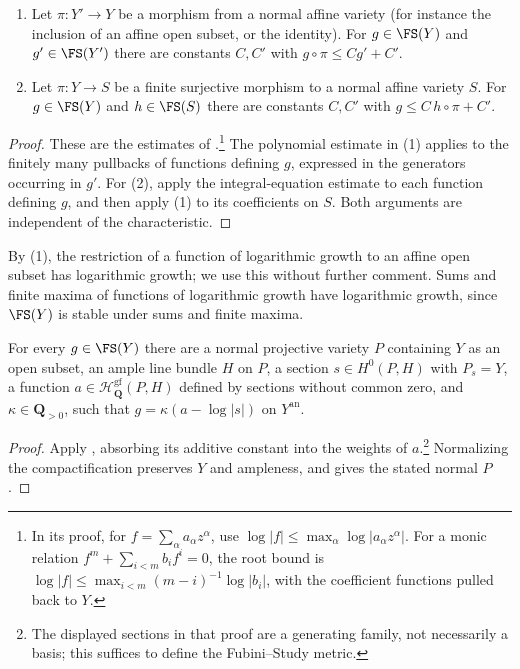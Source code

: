 \documentclass[11pt,a4paper]{article}
\newcommand{\an}{\mathrm{an}}          %
\begin{document}
\begin{lemma}\label{lem:growth}
\begin{enumerate}
\item Let $\pi\colon Y'\to Y$ be a morphism from a normal affine variety \textup(for instance the inclusion of an affine open subset, or the identity\textup). For $g\in\FS(Y)$ and $g'\in\FS(Y')$ there are constants $C,C'$ with $g\circ\pi\le Cg'+C'$.
\item Let $\pi\colon Y\to S$ be a finite surjective morphism to a normal affine variety $S$. For $g\in\FS(Y)$ and $h\in\FS(S)$ there are constants $C,C'$ with $g\le C\,h\circ\pi+C'$.
\end{enumerate}
\end{lemma}

\begin{proof}
These are the estimates of \cite[Lemma~3.16]{Wu26}.\footnote{In its proof, for $f=\sum_\alpha a_\alpha z^\alpha$, use $\log|f|\le\max_\alpha\log|a_\alpha z^\alpha|$. For a monic relation $f^m+\sum_{i<m}b_if^i=0$, the root bound is $\log|f|\le\max_{i<m}(m-i)^{-1}\log|b_i|$, with the coefficient functions pulled back to $Y$.} The polynomial estimate in (1) applies to the finitely many pullbacks of functions defining $g$, expressed in the generators occurring in $g'$. For (2), apply the integral-equation estimate to each function defining $g$, and then apply (1) to its coefficients on $S$. Both arguments are independent of the characteristic.
\end{proof}

By (1), the restriction of a function of logarithmic growth to an affine open subset has logarithmic growth; we use this without further comment. Sums and finite maxima of functions of logarithmic growth have logarithmic growth, since $\FS(Y)$ is stable under sums and finite maxima.

\begin{lemma}\label{lem:boundary-presentation}
For every $g\in\FS(Y)$ there are a normal projective variety $P$ containing $Y$ as an open subset, an ample line bundle $H$ on $P$, a section $s\in H^0(P,H)$ with $P_s=Y$, a function $a\in\mathcal{H}^{\mathrm{gf}}_{\mathbf{Q}}(P,H)$ defined by sections without common zero, and $\kappa\in\mathbf Q_{>0}$, such that $g=\kappa(a-\log|s|)$ on $Y^{\an}$.
\end{lemma}

\begin{proof}
Apply \cite[Proposition~3.17(2)]{Wu26}, absorbing its additive constant into the weights of $a$.\footnote{The displayed sections in that proof are a generating family, not necessarily a basis; this suffices to define the Fubini--Study metric.} Normalizing the compactification preserves $Y$ and ampleness, and gives the stated normal $P$.
\end{proof}
\end{document}
